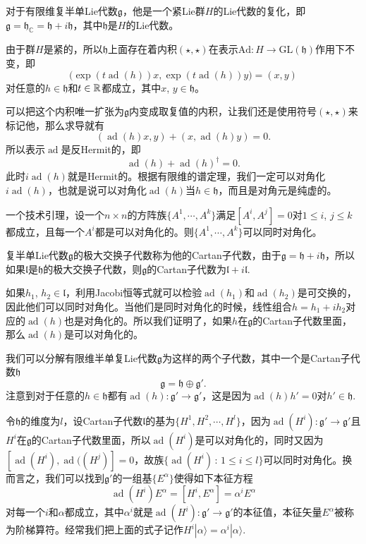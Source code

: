 \documentclass[9pt]{extarticle}
\newcommand{\cc}{\mathbb{C}}
\newcommand{\lag}{{\mathfrak{g}}}
\DeclareMathOperator{\ad}{ad}
\begin{document}
\theo 对于有限维复半单Lie代数$\lag$，他是一个紧Lie群$H$的Lie代数的复化，即$\lag=\mathfrak{h}_{\cc}=\mathfrak{h}+i\mathfrak{h}$，其中$\mathfrak{h}$是$H$的Lie代数。

由于群$H$是紧的，所以$\mathfrak{h}$上面存在着内积$(\star,\star)$在表示$\mathrm{Ad}:H\to \mathrm{GL}(\mathfrak{h})$作用下不变，即
\[
	\bigl(\exp(t\ad(h))x,\exp(t\ad(h))y\bigr)=(x,y)
\]
对任意的$h\in\mathfrak{h}$和$t\in \mathbb{R}$都成立，其中$x$, $y\in\mathfrak{h}$。

可以把这个内积唯一扩张为$\lag$内变成取复值的内积，让我们还是使用符号$(\star,\star)$来标记他，那么求导就有
\[
	(\ad(h)x,y)+(x,\ad(h)y)=0.
\]
所以表示$\ad$是反Hermit的，即
\[
	\ad(h)+\ad(h)^\dag=0.
\]
此时$i\ad(h)$就是Hermit的。根据有限维的谱定理，我们一定可以对角化$i\ad(h)$，也就是说可以对角化$\ad(h)$当$h\in \mathfrak{h}$，而且是对角元是纯虚的。

\lem 一个技术引理，设一个$n\times n$的方阵族$\{A^1,\cdots,A^k\}$满足$[A^i,A^j]=0$对$1\leq i$, $j\leq k$都成立，且每一个$A^i$都是可以对角化的。则$\{A^1,\cdots,A^k\}$可以同时对角化。

\para 复半单Lie代数$\lag$的极大交换子代数称为他的Cartan子代数，由于$\lag=\mathfrak{h}+i\mathfrak{h}$，所以如果$\mathfrak{l}$是$\mathfrak{h}$的极大交换子代数，则$\lag$的Cartan子代数为$\mathfrak{l}+i\mathfrak{l}$.

如果$h_1$, $h_2\in\mathfrak{l}$，利用Jacobi恒等式就可以检验$\ad(h_1)$和$\ad(h_2)$是可交换的，因此他们可以同时对角化。当他们是同时对角化的时候，线性组合$h=h_1+ih_2$对应的$\ad(h)$也是对角化的。所以我们证明了，如果$h$在$\lag$的Cartan子代数里面，那么$\ad(h)$是可以对角化的。

\para 我们可以分解有限维半单复Lie代数$\lag$为这样的两个子代数，其中一个是Cartan子代数$\mathfrak{h}$
\[
	\lag=\mathfrak{h}\oplus \lag'.
\]
注意到对于任意的$h\in \mathfrak{h}$都有$\ad(h):\lag'\to \lag'$，这是因为$\ad(h)h'=0$对$h'\in \mathfrak{h}$.

\para 令$\mathfrak{h}$的维度为$l$，设Cartan子代数$\mathfrak{l}$的基为$\{H^1,H^2,\cdots,H^l\}$，因为$\ad(H^i):\lag'\to \lag'$且$H^i$在$\lag$的Cartan子代数里面，所以$\ad(H^i)$是可以对角化的，同时又因为$[\ad(H^i),\ad((H^j)]=0$，故族$\{\ad(H^i)\,:\, 1\leq i\leq l\}$可以同时对角化。换而言之，我们可以找到$\lag'$的一组基$\{E^\alpha\}$使得如下本征方程
\[
	\ad(H^i)E^\alpha=[H^i,E^\alpha]=\alpha^iE^\alpha
\]
对每一个$i$和$\alpha$都成立，其中$\alpha^i$就是$\ad(H^i):\lag'\to \lag'$的本征值，本征矢量$E^\alpha$被称为阶梯算符。经常我们把上面的式子记作$H^i|\alpha\rangle=\alpha^i|\alpha\rangle$.

\end{document}
